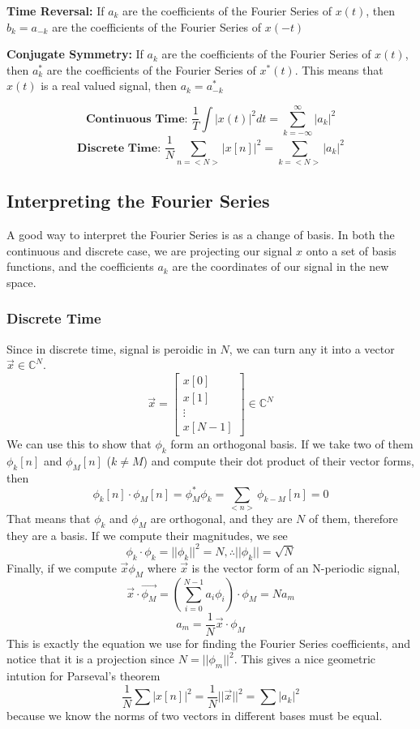 \textbf{Time Reversal: }
If $a_k$ are the coefficients of the Fourier Series of $x(t)$,
then $b_k=a_{-k}$ are the coefficients of the Fourier Series of $x(-t)$

\textbf{Conjugate Symmetry: }
If $a_k$ are the coefficients of the Fourier Series of $x(t)$,
then $a_k^*$ are the coefficients of the Fourier Series of $x^*(t)$. 
This means that $x(t)$ is a real valued signal, then $a_k=a_{-k}^*$
\begin{theorem}
  \[
	\textbf{Continuous Time: } \frac{1}{T}\int{|x(t)|^2dt} = \sum_{k=-\infty}^{\infty}{|a_k|^2}
  \]
  \[
	\textbf{Discrete Time: } \frac{1}{N}\sum_{n=<N>}{|x[n]|^2} = \sum_{k=<N>}{|a_k|^2} 
  \]
\end{theorem}
\subsection{Interpreting the Fourier Series}
A good way to interpret the Fourier Series is as a change of basis. In both the continuous and discrete case,
we are projecting our signal $x$ onto a set of basis functions, and the coefficients $a_k$ are the coordinates
of our signal in the new space.
\subsubsection{Discrete Time}
Since in discrete time, signal is peroidic in $N$, we can turn any it into a vector $\vec{x}\in \mathbb{C}^N$.
\[
    \vec{x} = \left[
        \begin{array}{c}
            x[0]\\
            x[1]\\
            \vdots\\
            x[N-1]
        \end{array}
    \right] \in \mathbb{C}^N
\]
We can use this to show that $\phi_k$ form an orthogonal basis.
If we take two of them $\phi_k[n]$ and $\phi_M[n]$ ($k\ne M$) and compute their dot product of their vector forms, then
\[
\phi_k[n] \cdot \phi_M[n] = \phi_M^*\phi_k = \sum_{<n>}{\phi_{k-M}[n]} = 0
\]
That means that $\phi_k$ and $\phi_M$ are orthogonal, and they are $N$ of them, therefore they are a basis.
If we compute their magnitudes, we see
\[
\phi_k \cdot \phi_k = ||\phi_k||^2 = N, \therefore ||\phi_k|| = \sqrt{N}
\]
Finally, if we compute $\vec{x}\phi_M$ where $\vec{x}$ is the vector form of an N-periodic signal,
\[
\vec{x}\cdot \vec{\phi_M} = \left(\sum_{i=0}^{N-1}{a_i\phi_i}\right)\cdot \phi_M = Na_m
\]
\[
a_m = \frac{1}{N}\vec{x}\cdot \phi_M
\]
This is exactly the equation we use for finding the Fourier Series coefficients, and notice that it is a
projection since $N = ||\phi_m||^2$. This gives a nice geometric intution for Parseval's theorem
\[
\frac{1}{N}\sum{|x[n]|^2} = \frac{1}{N}||\vec{x}||^2 = \sum{|a_k|^2}
\]
because we know the norms of two vectors in different bases must be equal.
